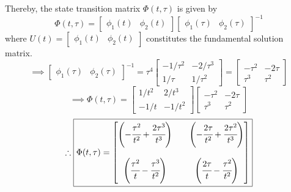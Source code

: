 Thereby, the state transition matrix \( \Phi(t,\tau) \) is given by
\begin{equation*}
    \Phi(t,\tau)
    =
    \begin{bmatrix}
        \phi_1(t) & \phi_2(t)
    \end{bmatrix}
    \begin{bmatrix}
        \phi_1(\tau) & \phi_2(\tau)
    \end{bmatrix}^{-1}
\end{equation*}
where \( U(t) = \begin{bmatrix} \phi_1(t) & \phi_2(t) \end{bmatrix} \) constitutes the fundamental solution matrix.
\begin{equation*}
    \implies
    \begin{bmatrix}
        \phi_1(\tau) & \phi_2(\tau)
    \end{bmatrix}^{-1}
    =
    \tau^4
    \begin{bmatrix}
        -1/\tau^2 & -2/\tau^3 \\
        1/\tau    & 1/\tau^2
    \end{bmatrix}
    =
    \begin{bmatrix}
        -\tau^2 & -2\tau \\
        \tau^3  & \tau^2
    \end{bmatrix}
\end{equation*}
\begin{equation*}
    \implies
    \Phi(t,\tau)
    =
    \begin{bmatrix}
        1/t^2 & 2/t^3  \\
        -1/t  & -1/t^2
    \end{bmatrix}
    \begin{bmatrix}
        -\tau^2 & -2\tau \\
        \tau^3  & \tau^2
    \end{bmatrix}
\end{equation*}
\begin{equation*}
    \therefore
    \boxed{
        \Phi(t,\tau)
        =
        \begin{bmatrix}
            \left( -\cfrac{\tau^2}{t^2} + \cfrac{2\tau^3}{t^3} \right)
             &  &
            \left( -\cfrac{2\tau}{t^2} + \cfrac{2\tau^2}{t^3}  \right)
            \\ \\
            \left( \cfrac{\tau^2}{t} - \cfrac{\tau^3}{t^2}  \right)
             &  &
            \left( \cfrac{2\tau}{t} - \cfrac{\tau^2}{t^2}  \right)
        \end{bmatrix}
    }
\end{equation*}

